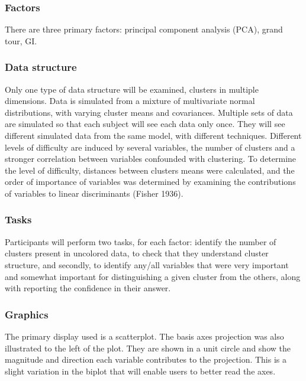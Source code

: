 \documentclass[
  11,
]{article}
\begin{document}
\hypertarget{sec:factors}{%
\subsubsection{Factors}\label{sec:factors}}

There are three primary factors: principal component analysis (PCA), grand tour, GI.

\hypertarget{data-structure}{%
\subsubsection{Data structure}\label{data-structure}}

Only one type of data structure will be examined, clusters in multiple dimensions. Data is simulated from a mixture of multivariate normal distributions, with varying cluster means and covariances. Multiple sets of data are simulated so that each subject will see each data only once. They will see different simulated data from the same model, with different techniques. Different levels of difficulty are induced by several variables, the number of clusters and a stronger correlation between variables confounded with clustering. To determine the level of difficulty, distances between clusters means were calculated, and the order of importance of variables was determined by examining the contributions of variables to linear discriminants (Fisher 1936).

\hypertarget{sec:tasks}{%
\subsubsection{Tasks}\label{sec:tasks}}

Participants will perform two tasks, for each factor: identify the number of clusters present in uncolored data, to check that they understand cluster structure, and secondly, to identify any/all variables that were very important and somewhat important for distinguishing a given cluster from the others, along with reporting the confidence in their answer.

\hypertarget{graphics}{%
\subsubsection{Graphics}\label{graphics}}

The primary display used is a scatterplot. The basis axes projection was also illustrated to the left of the plot. They are shown in a unit circle and show the magnitude and direction each variable contributes to the projection. This is a slight variation in the biplot that will enable users to better read the axes.
\end{document}
